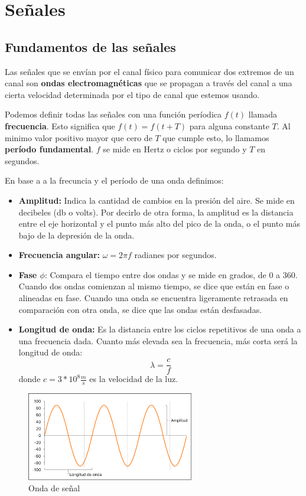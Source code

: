 \section{Señales}
\subsection{Fundamentos de las señales}
Las señales que se envían por el canal físico para comunicar dos extremos de un canal son \textbf{ondas electromagnéticas} que se propagan a través del canal a una cierta velocidad determinada por el tipo de canal que estemos usando.


Podemos definir todas las señales con una función períodica \(f(t)\) llamada \textbf{frecuencia}. Esto significa que \(f(t) = f(t + T)\) para alguna constante \(T\). Al minimo valor positivo mayor que cero de \(T\) que cumple esto, lo llamamos \textbf{período fundamental}. \(f\) se mide en Hertz o ciclos por segundo y \(T\) en segundos. 

En base a a la frecuncia y el período de una onda definimos:

\begin{itemize}
  \item \textbf{Amplitud:} Indica la cantidad de cambios en la presión del aire. Se mide en decibeles (db o volts). Por decirlo de otra forma, la amplitud es la distancia entre el eje horizontal y el punto más alto del pico de la onda, o el punto más bajo de la depresión de la onda.
  \item \textbf{Frecuencia angular:} \(\omega = 2\pi f\) radianes por segundos.
  \item \textbf{Fase \(\phi\)}: Compara el tiempo entre dos ondas y se mide en grados, de 0 a 360. Cuando dos ondas comienzan al mismo tiempo, se dice que están en fase o alineadas en fase. Cuando una onda se encuentra ligeramente retrasada en comparación con otra onda, se dice que las ondas están desfasadas.
  \item \textbf{Longitud de onda:} Es la distancia entre los ciclos repetitivos de una onda a una frecuencia dada. Cuanto más elevada sea la frecuencia, más corta será la longitud de onda: \[\lambda = \frac{c}{f}\]
  donde \(c=3*10^8\frac{m}{s}\) es la velocidad de la luz.
\end{itemize}
\begin{figure}[H]
	\centering
	\includegraphics[width=0.65\textwidth
]{images/amplitud.png}
	\caption[Onda de señal]{Onda de señal}
	\label{fig:sistema-comunicacion-real}
\end{figure}

